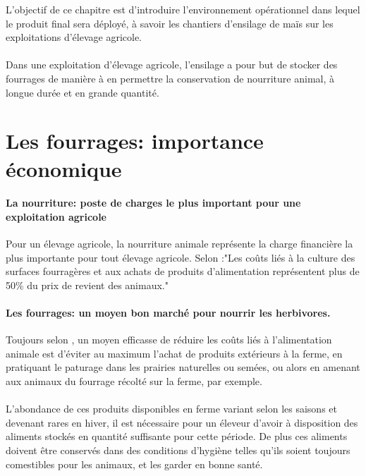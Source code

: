 \documentclass[12pt,a4paper]{report}
\begin{document}
L'objectif de ce chapitre est d'introduire l'environnement opérationnel dans lequel le produit final sera déployé, à savoir les chantiers d'ensilage de maïs sur les exploitations d'élevage agricole.

\paragraph{}

Dans une exploitation d'élevage agricole, l'ensilage a pour but  de stocker des fourrages de manière à en permettre la conservation de nourriture animal, à longue durée et en grande quantité.


\section{Les fourrages: importance économique}

\paragraph{La nourriture: poste de charges le plus important pour une exploitation agricole} Pour un élevage agricole, la nourriture animale représente la charge financière la plus importante pour tout élevage agricole. Selon \cite{wikipedia_alimentation_2017} :"Les coûts liés à la culture des surfaces fourragères et aux achats de produits d'alimentation représentent plus de 50\% du prix de revient des animaux."



\paragraph{Les fourrages: un moyen bon marché pour nourrir les herbivores.} Toujours selon \cite{wikipedia_alimentation_2017}, un moyen efficasse de réduire les coûts liés à l'alimentation animale est d'éviter au maximum l'achat de produits extérieurs à la ferme, en pratiquant le paturage dans les prairies naturelles ou semées, ou alors en amenant aux animaux du fourrage récolté sur la ferme, par exemple.

\paragraph{} L'abondance de ces produits disponibles en ferme variant selon les saisons et devenant rares en hiver, il est nécessaire pour un éleveur d'avoir à disposition des aliments stockés en quantité suffisante pour cette période. De plus ces aliments doivent être conservés dans des conditions d'hygiène  telles qu'ils soient toujours comestibles pour les animaux, et les garder en bonne santé.
\end{document}
